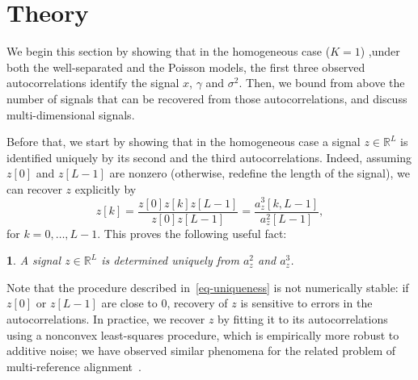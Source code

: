 \documentclass[12pt]{article}
\newcommand{\1}{\mathbf{1}}
\newcommand{\RL}{\mathbb{R}^L}
\theoremstyle{plain}
\theoremstyle{definition}
\theoremstyle{remark}
\theoremstyle{plain}
\theoremstyle{remark}
\theoremstyle{plain}
\theoremstyle{plain}
\theoremstyle{plain}
\newtheorem{proposition}[thm]{\protect\propositionname}
\providecommand{\propositionname}{Proposition}
\numberwithin{equation}{section}
\begin{document}
%

\section{Theory}

We begin this section by showing that in the homogeneous case ($K=1$) ,under both the well-separated and the Poisson models, the first three observed autocorrelations  identify the signal $x$, $\gamma$ and $\sigma^2$.  Then, we bound from above the number of signals that can be recovered from those autocorrelations, and discuss multi-dimensional signals.

Before that, we start by showing that in the homogeneous case a signal $z\in\RL$ is identified uniquely by its second and the third autocorrelations.
 Indeed, assuming $z[0]$ and $z[L-1]$ are nonzero (otherwise, redefine the length of the signal), we can recover $z$ explicitly by 
\begin{equation}
%
z[k]  = \frac{z[0]z[k]z[L-1]}{z[0]z[L-1]} = \frac{a_z^3[k,L-1]}{a_z^2[L-1]},
\label{eq-uniqueness}
%
\end{equation}
for $k = 0, \ldots, L-1$.
This proves the following useful fact:
\begin{proposition} \label{prop:uniqueness}
	A signal $z\in\RL$ is determined uniquely from  $a_z^2$ and $a_z^3$. 
\end{proposition}

Note that the procedure described in~\eqref{eq-uniqueness} is not numerically stable: if $z[0]$ or $z[L-1]$ are close to 0, recovery of $z$ is sensitive to errors in the autocorrelations. In practice, we recover $z$ by fitting it to its autocorrelations using a nonconvex least-squares procedure, which is empirically more robust to additive noise; we have observed similar phenomena for the related problem of multi-reference alignment~\cite{bendory2017bispectrum,boumal2017heterogeneous,abbe2017multireference}.
\end{document}
